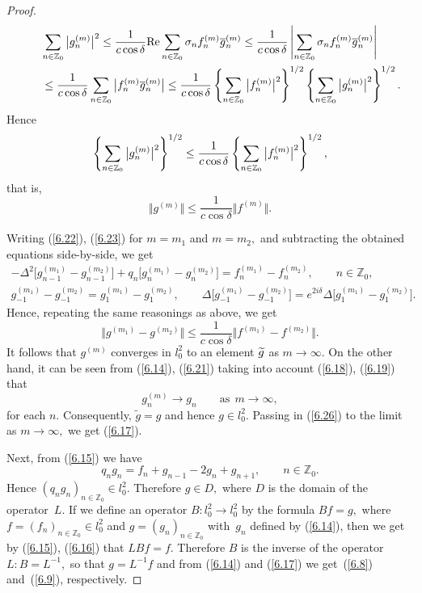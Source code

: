 \documentclass[pdftex]{sigma}
\numberwithin{equation}{section}
\begin{document}
\begin{proof}
\begin{gather*}
\sum_{n\in
\mathbb{Z}
_{0}}\big\vert g_{n}^{(m)}\big\vert ^{2}\leq \frac{1}{c\cos \delta }%
{\rm Re}\sum_{n\in
\mathbb{Z}
_{0}}\sigma _{n}f_{n}^{(m)}\overline{g}_{n}^{(m)}
\leq \frac{1}{c\cos \delta }\left\vert \sum_{n\in
\mathbb{Z}
_{0}}\sigma _{n}f_{n}^{(m)}\overline{g}_{n}^{(m)}\right\vert \\
\qquad {} \leq \frac{1}{%
c\cos \delta }\sum_{n\in
\mathbb{Z}
_{0}}\big\vert f_{n}^{(m)}\overline{g}_{n}^{(m)}\big\vert
\leq \frac{1}{c\cos \delta }\left\{ \sum_{n\in
\mathbb{Z}
_{0}}\big\vert f_{n}^{(m)}\big\vert ^{2}\right\} ^{1/2}\left\{ \sum_{n\in
\mathbb{Z}
_{0}}\big\vert g_{n}^{(m)}\big\vert ^{2}\right\} ^{1/2}.
\end{gather*}
Hence%
\[
\left\{ \sum_{n\in
\mathbb{Z}
_{0}}\big\vert g_{n}^{(m)}\big\vert ^{2}\right\} ^{1/2}\leq \frac{1}{%
c\cos \delta }\left\{ \sum_{n\in
\mathbb{Z}
_{0}}\big\vert f_{n}^{(m)}\big\vert ^{2}\right\} ^{1/2},
\]%
that is,%
\begin{equation}
\big\Vert g^{(m)}\big\Vert \leq \frac{1}{c\cos \delta }\big\Vert
f^{(m)}\big\Vert .  \label{6.26}
\end{equation}

Writing (\ref{6.22}), (\ref{6.23}) for $m=m_{1}$ and $m=m_{2},$ and
subtracting the obtained equations side-by-side, we get%
\begin{gather*}
-\Delta
^{2}\big[g_{n-1}^{(m_{1})}-g_{n-1}^{(m_{2})}\big]+q_{n}\big[g_{n}^{(m_{1})}-g_{n}^{(m_{2})}\big]=f_{n}^{(m_{1})}-f_{n}^{(m_{2})},%
\qquad n\in
\mathbb{Z}
_{0},
\\
g_{-1}^{(m_{1})}-g_{-1}^{(m_{2})}=g_{1}^{(m_{1})}-g_{1}^{(m_{2})},\qquad \Delta \big[ g_{-1}^{(m_{1})}-g_{-1}^{(m_{2})}\big]=e^{2i\delta }\Delta
\big[ g_{1}^{(m_{1})}-g_{1}^{(m_{2})}\big].
\end{gather*}
Hence, repeating the same reasonings as above, we get%
\[
\big\Vert g^{(m_{1})}-g^{(m_{2})}\big\Vert \leq \frac{1}{c\cos \delta }%
\big\Vert f^{(m_{1})}-f^{(m_{2})}\big\Vert .
\]%
It follows that $g^{(m)}$ converges in $l_{0}^{2}$ to an element $\widetilde{%
g}$ as $m\rightarrow \infty .$ On the other hand, it can be seen from (\ref{6.14}), (\ref{6.21}) taking into account (\ref{6.18}), (\ref{6.19}) that%
\[
g_{n}^{(m)}\rightarrow g_{n}\qquad \text{as} \ \ m\rightarrow \infty ,
\]%
for each $n$. Consequently, $\widetilde{g}=g$ and hence $g\in l_{0}^{2}.$
Passing in (\ref{6.26}) to the limit as $m\rightarrow \infty ,$ we get (\ref{6.17}).

Next, from (\ref{6.15}) we have%
\[
q_{n}g_{n}=f_{n}+g_{n-1}-2g_{n}+g_{n+1},\qquad n\in
\mathbb{Z}
_{0}.
\]
Hence $(q_{n}g_{n})_{n\in
\mathbb{Z}
_{0}}\in l_{0}^{2}.$ Therefore $g\in D,$ where $D$ is the domain of the
operator~$L$. If we def\/ine an operator $B:l_{0}^{2}\rightarrow l_{0}^{2}$ by
the formula $Bf=g,$ where $f=(f_{n})_{n\in
\mathbb{Z}
_{0}}\in l_{0}^{2}$ and $g=(g_{n})_{n\in
\mathbb{Z}
_{0}}$ with~$g_{n}$ def\/ined by (\ref{6.14}), then we get by (\ref{6.15}), (\ref{6.16}) that $LBf=f.$ Therefore $B$ is the inverse of the operator $%
L:B=L^{-1},$ so that $g=L^{-1}f$ and from (\ref{6.14}) and (\ref{6.17}) we
get~(\ref{6.8}) and~(\ref{6.9}), respectively.
\end{proof}
\end{document}
